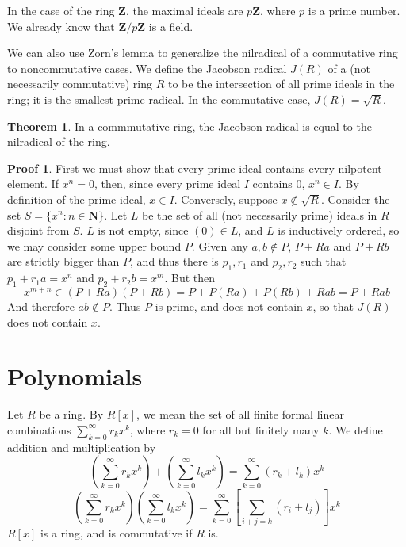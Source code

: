 \documentclass[12pt]{amsbook}
\theoremstyle{definition}
\newtheorem{theorem}{Theorem}[chapter]
\newtheorem*{prf}{Proof}
\begin{document}
In the case of the ring $\mathbf{Z}$, the maximal ideals are $p\mathbf{Z}$, where $p$ is a prime number. We already know that $\mathbf{Z}/p\mathbf{Z}$ is a field.

We can also use Zorn's lemma to generalize the nilradical of a commutative ring to noncommutative cases. We define the Jacobson radical $J(R)$ of a (not necessarily commutative) ring $R$ to be the intersection of all prime ideals in the ring; it is the smallest prime radical. In the commutative case, $J(R) = \sqrt{R}$.

\begin{theorem}
    In a commmutative ring, the Jacobson radical is equal to the nilradical of the ring.
\end{theorem}
\begin{prf}
    First we must show that every prime ideal contains every nilpotent element. If $x^n = 0$, then, since every prime ideal $I$ contains $0$, $x^n \in I$. By definition of the prime ideal, $x \in I$. Conversely, suppose $x \not\in \sqrt{R}$. Consider the set $S = \{ x^n : n \in \mathbf{N} \}$. Let $L$ be the set of all (not necessarily prime) ideals in $R$ disjoint from $S$. $L$ is not empty, since $(0) \in L$, and $L$ is inductively ordered, so we may consider some upper bound $P$. Given any $a,b \not\in P$, $P + Ra$ and $P + Rb$ are strictly bigger than $P$, and thus there is $p_1,r_1$ and $p_2,r_2$ such that $p_1 + r_1a = x^n$ and $p_2 + r_2b = x^m$. But then
    \[ x^{m + n} \in (P + Ra)(P + Rb) = P + P(Ra) + P(Rb) + Rab = P + Rab \]
    And therefore $ab \notin P$. Thus $P$ is prime, and does not contain $x$, so that $J(R)$ does not contain $x$.
\end{prf}



\chapter{Polynomials}

Let $R$ be a ring. By $R[x]$, we mean the set of all finite formal linear combinations $\sum_{k = 0}^\infty r_k x^k$, where $r_k = 0$ for all but finitely many $k$. We define addition and multiplication by
%
\[ \left( \sum_{k = 0}^\infty r_kx^k \right) + \left( \sum_{k = 0}^\infty l_kx^k \right) = \sum_{k = 0}^\infty (r_k + l_k)x^k \]
%
\[ \left( \sum_{k = 0}^\infty r_kx^k \right) \left( \sum_{k = 0}^\infty l_kx^k \right) = \sum_{k = 0}^\infty \left[ \sum_{i + j = k} (r_i + l_j) \right] x^k \]
%
$R[x]$ is a ring, and is commutative if $R$ is.
\end{document}
